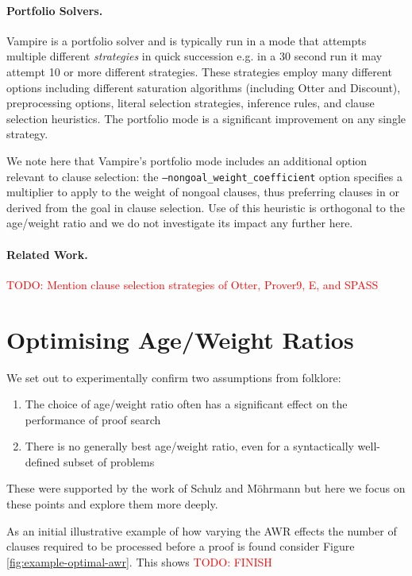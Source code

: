 \documentclass{llncs}
\newcommand{\todo}[1]{\textcolor{red}{TODO: #1}}
\newcommand{\sandm}{Schulz and M{\"{o}}hrmann}
\begin{document}
\paragraph{Portfolio Solvers.}

Vampire is a portfolio solver and is typically run in a mode that attempts multiple different \emph{strategies} in quick succession e.g. in a 30 second run it may attempt 10 or more different strategies. These strategies employ many different options including different saturation algorithms (including Otter and Discount), preprocessing options, literal selection strategies, inference rules, and clause selection heuristics. The portfolio mode is a significant improvement on any single strategy. 

We note here that Vampire's portfolio mode includes an additional option relevant to clause selection: the \texttt{--nongoal\_weight\_coefficient} option specifies a multiplier to apply to the weight of nongoal clauses, thus preferring clauses in or derived from the goal in clause selection. Use of this heuristic is orthogonal to the age/weight ratio and we do not investigate its impact any further here.

\paragraph{Related Work.} \todo{Mention clause selection strategies of Otter, Prover9, E, and SPASS}

\newpage
\section{Optimising Age/Weight Ratios} \label{sec:awr:study}

We set out to experimentally confirm two assumptions from folklore:
\begin{enumerate}
	\item The choice of age/weight ratio often has a significant effect on the performance of proof search
	\item There is no generally best age/weight ratio, even for a syntactically well-defined subset of problems
\end{enumerate}
These were supported by the work of \sandm{} but here we focus on these points and explore them more deeply.

As an initial illustrative example of how varying the AWR effects the number of clauses required to be processed before a proof is found consider Figure \ref{fig:example-optimal-awr}. This shows \todo{FINISH}
\end{document}
